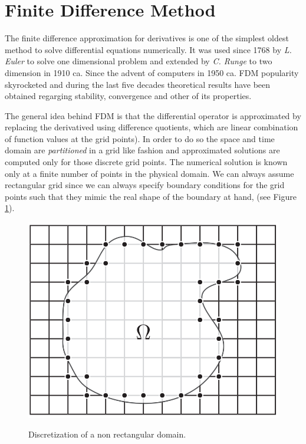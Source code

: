     \section{Finite Difference Method}
The finite difference approximation for derivatives is one of the simplest oldest method to solve differential equations numerically. It was used since 1768 by \textit{L. Euler} to solve one dimensional problem and extended by \textit{C. Runge} to two dimension in 1910 ca. Since the advent of computers in 1950 ca. FDM  popularity skyrocketed and during the last five decades theoretical results have been obtained regarging stability, convergence and other of its properties.


    The general idea behind FDM is that the differential operator is approximated by replacing the derivatived using difference quotients, which are linear combination of function values at the grid points). In order to do so the space and time domain are \textit{partitioned} in a grid like fashion and approximated solutions are computed only for those discrete grid points. The numerical solution is known only at a finite number of points in the physical domain.
    We can always assume rectangular grid since we can always  specify boundary conditions for the grid points such that they mimic the real shape of the boundary at hand, (see Figure \ref{fig:grid_custom_shape}).
 
       
\begin{figure}
\centering
\includegraphics[scale=0.4]{./images/CA_FDM/grid_custom_shape}
\label{fig:grid_custom_shape}
\caption{Discretization of a non rectangular domain.}
\end{figure}    
    
